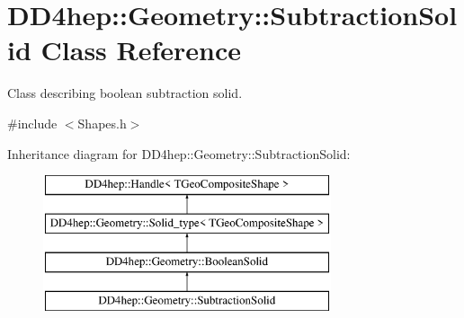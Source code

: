 \hypertarget{class_d_d4hep_1_1_geometry_1_1_subtraction_solid}{}\section{D\+D4hep\+:\+:Geometry\+:\+:Subtraction\+Solid Class Reference}
\label{class_d_d4hep_1_1_geometry_1_1_subtraction_solid}


Class describing boolean subtraction solid.  




{\ttfamily \#include $<$Shapes.\+h$>$}

Inheritance diagram for D\+D4hep\+:\+:Geometry\+:\+:Subtraction\+Solid\+:\begin{figure}[H]
\begin{center}
\leavevmode
\includegraphics[height=4.000000cm]{class_d_d4hep_1_1_geometry_1_1_subtraction_solid}
\end{center}
\end{figure}
